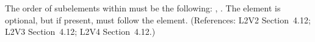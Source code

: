 The order of subelements within \Constraint must be the following:
, .  The  element is optional,
but if present, must follow the  element.  (References: L2V2
Section~4.12; L2V3 Section~4.12; L2V4 Section~4.12.)
